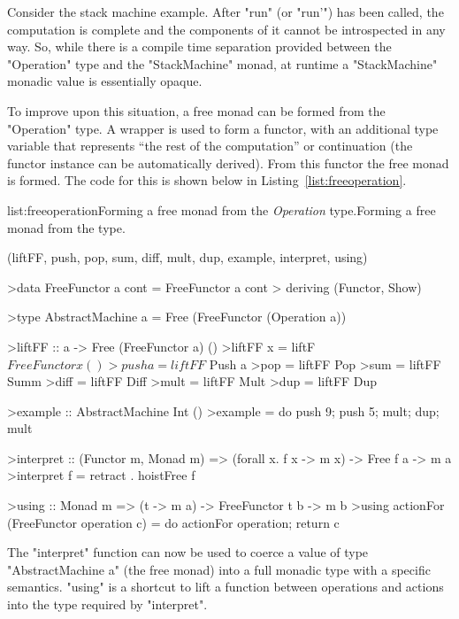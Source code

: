 Consider the stack machine example. After "run" (or "run'") has been called, the computation is complete and the components of it cannot be introspected in any way. So, while there is a compile time separation provided between the "Operation" type and the "StackMachine" monad, at runtime a "StackMachine" monadic value is essentially opaque.

To improve upon this situation, a free monad can be formed from the "Operation" type. A wrapper is used to form a functor, with an additional type variable that represents ``the rest of the computation'' or continuation (the functor instance can be automatically derived). From this functor the free monad is formed. The code for this is shown below in Listing~\ref{list:freeoperation}.

\vspace{-0.5em}
\begin{listing}{list:freeoperation}{Forming a free monad from the \emph{Operation} type.}{Forming a free monad from the  type.}{}
\end{listing}\vspace{-1.5em}

\functions(liftFF, push, pop, sum, diff, mult, dup, example, interpret, using)
\begin{haskell}
>data FreeFunctor a cont = FreeFunctor a cont 
>  deriving (Functor, Show)

>type AbstractMachine a = Free (FreeFunctor (Operation a))

>liftFF :: a -> Free (FreeFunctor a) ()
>liftFF x = liftF $ FreeFunctor x ()

>push a = liftFF $ Push a
>pop = liftFF Pop
>sum = liftFF Summ
>diff = liftFF Diff
>mult = liftFF Mult
>dup = liftFF Dup

>example :: AbstractMachine Int ()
>example = do push 9; push 5; mult; dup; mult

>interpret :: (Functor m, Monad m) => (forall x. f x -> m x) -> Free f a -> m a
>interpret f = retract . hoistFree f

>using :: Monad m => (t -> m a) -> FreeFunctor t b -> m b
>using actionFor (FreeFunctor operation c) = do actionFor operation; return c

\end{haskell}
\noindent
The "interpret" function can now be used to coerce a value of type "AbstractMachine a" (the free monad) into a full monadic type with a specific semantics. "using" is a shortcut to lift a function between operations and actions into the type required by "interpret".

